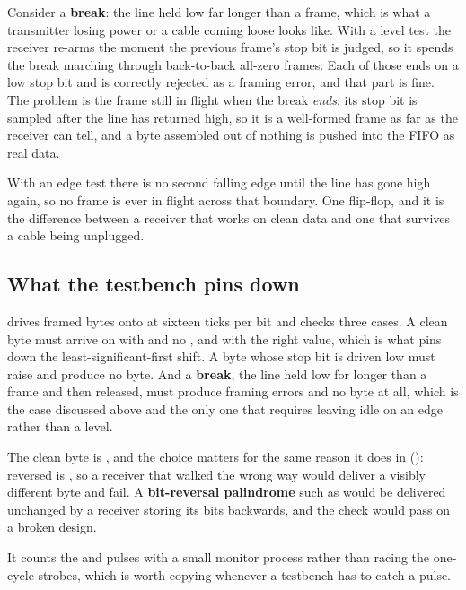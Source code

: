 Consider a \textbf{break}: the line held low far longer than a frame, which is what a transmitter
losing power or a cable coming loose looks like. With a level test the receiver re-arms the moment
the previous frame's stop bit is judged, so it spends the break marching through back-to-back
all-zero frames. Each of those ends on a low stop bit and is correctly rejected as a framing error,
and that part is fine. The problem is the frame still in flight when the break \emph{ends}: its stop
bit is sampled after the line has returned high, so it is a well-formed frame as far as the receiver
can tell, and a byte assembled out of nothing is pushed into the FIFO as real data.

With an edge test there is no second falling edge until the line has gone high again, so no frame is
ever in flight across that boundary. One flip-flop, and it is the difference between a receiver that
works on clean data and one that survives a cable being unplugged.

\subsection{What the testbench pins down}
\label{c3:sec:uart_rx_tb}
 drives framed bytes onto  at sixteen ticks per bit and checks three
cases. A clean byte must arrive on  with  and no , and
with the right value, which is what pins down the least-significant-first shift. A byte whose stop
bit is driven low must raise  and produce no  byte. And a
\textbf{break}, the line held low for longer than a frame and then released, must produce framing
errors and no byte at all, which is the case discussed above and the only one that requires leaving
idle on an edge rather than a level.

The clean byte is , and the choice matters for the same reason it does in 
():  reversed is , so a receiver that walked
 the wrong way would deliver a visibly different byte and fail. A \textbf{bit-reversal
palindrome} such as  would be delivered unchanged by a receiver storing its bits
backwards, and the check would pass on a broken design.

It counts the  and  pulses with a small monitor process rather than
racing the one-cycle strobes, which is worth copying whenever a testbench has to catch a pulse.


